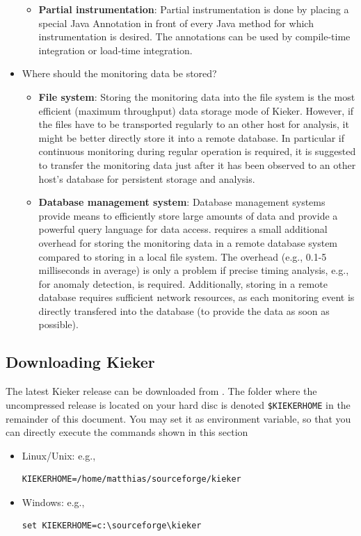 \documentclass[a4paper,12pt]{scrartcl}
\begin{document}
\begin{itemize}
\begin{itemize}
\item \textbf{Partial instrumentation}: Partial instrumentation is done by placing a special Java Annotation in front of every Java method for which instrumentation is desired. The annotations can be used by compile-time integration or load-time integration.
\end{itemize}
\item Where should the monitoring data be stored?
\begin{itemize}
\item \textbf{File system}: Storing the monitoring data into the file system is the most efficient (maximum throughput) data storage mode of Kieker. However, if the files have to be transported regularly to an other host for analysis, it might be better directly store it into a remote database. In particular if continuous monitoring during regular operation is required, it is suggested to transfer the monitoring data just after it has been observed to an other host's database for persistent storage and analysis.
\item \textbf{Database management system}: Database management systems provide means to efficiently store large amounts of data and provide a powerful query language for data access. \tpmon{} requires a small additional overhead for storing the monitoring data in a remote database system compared to storing in a local file system. The overhead (e.g., 0.1-5 milliseconds in average) is only a problem if precise timing analysis, e.g., for anomaly detection, is required. Additionally, storing in a remote database requires sufficient network resources, as each monitoring event is directly transfered into the database (to provide the data as soon as possible). %
\end{itemize}
\end{itemize}

\subsection{Downloading Kieker}
The latest Kieker release can be downloaded from \kiekerurl{}. The folder where the uncompressed release is located on your hard disc is denoted \texttt{\$KIEKERHOME} in the remainder of this document. You may set it as environment variable, so that you can directly execute the commands shown in this section
\begin{itemize}
 \item Linux/Unix: e.g.,
\begin{lstlisting}[caption={}]
KIEKERHOME=/home/matthias/sourceforge/kieker
\end{lstlisting}
\item Windows: e.g.,
\begin{lstlisting}[caption={}]
set KIEKERHOME=c:\sourceforge\kieker
\end{lstlisting}
\end{itemize}
\end{document}
